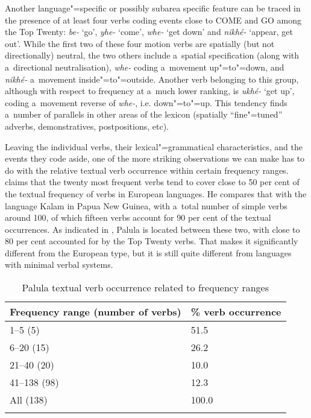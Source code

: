 Another language"=specific or possibly subarea specific feature can be traced in the presence of at least four verbs coding events close to COME and GO among the Top Twenty: \textit{be-} `go', \textit{yhe-} `come', \textit{whe-} `get down' and \textit{nikhé-} `appear, get out'. While the first two of these four motion verbs are spatially (but not directionally) neutral, the two others include a~spatial specification (along with a~directional neutralisation), \textit{whe-} coding a~movement up"=to"=down, and \textit{nikhé-} a~movement inside"=to"=outside. Another verb belonging to this group, although with respect to frequency at a~much lower ranking, is \textit{ukhé-} `get up', coding a~movement reverse of \textit{whe-}, i.e. down"=to"=up. This tendency finds a~number of parallels in other areas of the lexicon (spatially ``fine"=tuned'' adverbs, demonstratives, postpositions, etc).



Leaving the individual verbs, their lexical"=grammatical characteristics, and the events they code aside, one of the more striking observations we can make has to do with the relative textual verb occurrence within certain frequency ranges. \citet[409]{viberg2006} claims that the twenty most frequent verbs tend to cover close to 50 per cent of the textual frequency of verbs in European languages. He compares that with the language Kalam in Papua New Guinea, with a~total number of simple verbs around 100, of which fifteen verbs account for 90 per cent of the textual occurrences. As indicated in , Palula is located between these two, with close to 80 per cent accounted for by the Top Twenty verbs. That makes it significantly different from the European type, but it is still quite different from languages with minimal verbal systems. 


\begin{table}[ht]
\caption{Palula textual verb occurrence related to frequency ranges}

\begin{tabularx}{\textwidth}{ Q P{50mm} }
\lsptoprule
Frequency range (number of verbs) &
\%  verb occurrence\\--5 (5) &
\phantom{1}51.5\\
6--20 (15) &
\phantom{1}26.2\\
21--40 (20) &
\phantom{1}10.0\\
41--138 (98) &
\phantom{1}12.3\\
All (138) &
100.0\\\lspbottomrule
\end{tabularx}
\label{tab:8-2}
\end{table}


